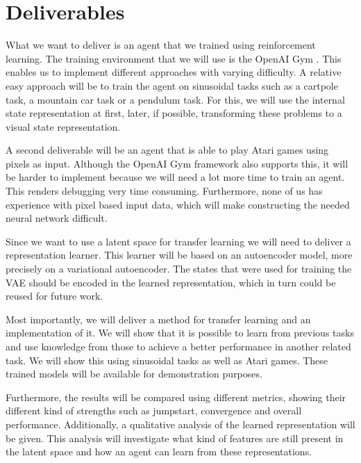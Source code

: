 \section{Deliverables}
\label{sec:deliverables}

What we want to deliver is an agent that we trained using reinforcement learning. The training environment that we will use is the OpenAI Gym \citep{openaigym}. This enables us to implement different approaches with varying difficulty. A relative easy approach will be to train the agent on sinusoidal tasks such as a cartpole task, a mountain car task or a pendulum task. For this, we will use the internal state representation at first, later, if possible, transforming these problems to a visual state representation. 

A second deliverable will be an agent that is able to play Atari games using pixels as input. Although the OpenAI Gym framework also supports this, it will be harder to implement because we will need a lot more time to train an agent. This renders debugging very time consuming. Furthermore, none of us has experience with pixel based input data, which will make constructing the needed neural network difficult.

Since we want to use a latent space for transfer learning we will need to deliver a representation learner. This learner will be based on an autoencoder model, more precisely on a variational autoencoder. The states that were used for training the VAE should be encoded in the learned representation, which in turn could be reused for future work.

Most importantly, we will deliver a method for transfer learning and an implementation of it. We will show that it is possible to learn from previous tasks and use knowledge from those to achieve a better performance in another related task. We will show this using sinusoidal tasks as well as Atari games. These trained models will be available for demonstration purposes.

Furthermore, the results will be compared using different metrics, showing their different kind of strengths such as jumpstart, convergence and overall performance. Additionally, a qualitative analysis of the learned representation will be given. This analysis will investigate what kind of features are still present in the latent space and how an agent can learn from these representations.

